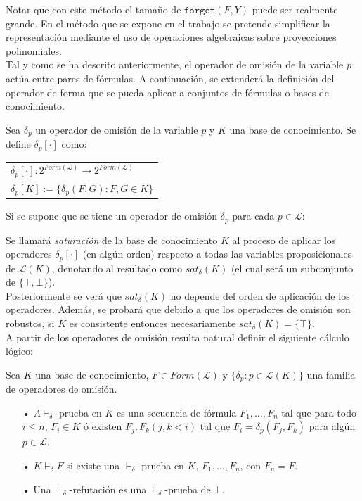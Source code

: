 \vspace{0.5cm}

Notar que con este método el tamaño de $\texttt{forget}(F,Y)$ puede ser realmente grande. En el método que se expone en el trabajo se pretende simplificar la representación mediante el uso de operaciones algebraicas sobre proyecciones polinomiales.\\

Tal y como se ha descrito anteriormente, el operador de omisión de la variable $p$ actúa entre pares de fórmulas. A continuación, se extenderá la definición del operador de forma que se pueda aplicar a conjuntos de fórmulas o bases de conocimiento.

 Sea $\delta_p$ un operador de omisión de la variable $p$ y $K$ una base de conocimiento. Se define $\delta_p [\cdot ]$ como:\\

\begin{tabular}{l}
$\delta_p [\cdot ] : 2^{Form(\mathcal{L})} \rightarrow 2^{Form(\mathcal{L})}$ \\
$\delta_p [K] := \{ \delta_p (F,G) : F,G \in K \}$
\end{tabular}

\vspace{0.5cm}

Si se supone que se tiene un operador de omisión $\delta_p$ para cada $p\in \mathcal{L}$:

 Se llamará \textit{saturación} de la base de conocimiento $K$ al proceso de aplicar los operadores $\delta_p [\cdot ]$ (en algún orden) respecto a todas las variables proposicionales de $\mathcal{L}(K)$, denotando al resultado como $sat_{\delta}(K)$ (el cual será un subconjunto de $\{ \top , \bot \}$).\\

Posteriormente se verá que $sat_{\delta}(K)$ no depende del orden de aplicación de los operadores. Además, se probará que debido a que los operadores de omisión son robustos, si $K$ es consistente entonces necesariamente $sat_{\delta}(K)=\{ \top \}$.\\

A partir de los operadores de omisión resulta natural definir el siguiente cálculo lógico:

 Sea $K$ una base de conocimiento, $F\in Form(\mathcal{L})$ y $\{ \delta_p : p \in \mathcal{L}(K) \}$ una familia de operadores de omisión.
\begin{itemize}
\item[•] $A \vdash_{\delta}$-prueba en $K$ es una secuencia de fórmula $F_1, \dots ,F_n$ tal que para todo $i \leq n$, $F_i \in K$ ó existen $F_j , F_k (j,k < i)$ tal que $F_i = \delta_p (F_j , F_k)$ para algún $p \in \mathcal{L}$.
\item[•] $K \vdash_{\delta} F$ si existe una $\vdash_{\delta}$-prueba en $K$, $F_1, \dots ,F_n$, con $F_n = F$.
\item[•] Una $\vdash_{\delta}$-refutación es una $\vdash_{\delta}$-prueba de $\bot$.
\end{itemize}

